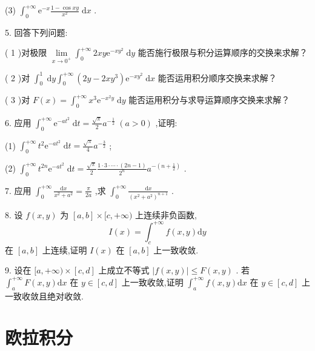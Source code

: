 (3) \({\int }_{0}^{+\infty }{\mathrm{e}}^{-x}\frac{1 - \cos {xy}}{{x}^{2}}\mathrm{\;d}x\) . 

5. 回答下列问题: 

( 1 )对极限 \(\mathop{\lim }\limits_{{x \rightarrow  {0}^{ + }}}{\int }_{0}^{+\infty }{2xy}{\mathrm{e}}^{-x{y}^{2}}\mathrm{\;d}y\) 能否施行极限与积分运算顺序的交换来求解？

 ( 2 )对 \({\int }_{0}^{1}\mathrm{\;d}y{\int }_{0}^{+\infty }\left( {{2y} - {2x}{y}^{3}}\right) {\mathrm{e}}^{-x{y}^{2}}\mathrm{\;d}x\) 能否运用积分顺序交换来求解？ 
 
 ( 3 )对 \(F\left( x\right)  = {\int }_{0}^{+\infty }{x}^{3}{\mathrm{e}}^{-{x}^{2}y}\mathrm{\;d}y\) 能否运用积分与求导运算顺序交换来求解？
 
  6. 应用 \({\int }_{0}^{+\infty }{\mathrm{e}}^{-a{t}^{2}}\mathrm{\;d}t = \frac{\sqrt{\pi }}{2}{a}^{-\frac{1}{2}}\;\left( {a > 0}\right)\) ,证明: 
  
  (1) \({\int }_{0}^{+\infty }{t}^{2}{\mathrm{e}}^{-a{t}^{2}}\mathrm{\;d}t = \frac{\sqrt{\pi }}{4}{a}^{-\frac{3}{2}}\) ;

(2) \({\int }_{0}^{+\infty }{t}^{2n}{\mathrm{e}}^{-a{t}^{2}}\mathrm{\;d}t = \frac{\sqrt{\pi }}{2}\frac{1 \cdot  3 \cdot  \cdots  \cdot  \left( {{2n} - 1}\right) }{{2}^{n}}{a}^{-\left( {n + \frac{1}{2}}\right) }\) .

7. 应用 \({\int }_{0}^{+\infty }\frac{\mathrm{d}x}{{x}^{2} + {a}^{2}} = \frac{\pi }{2a}\) ,求 \({\int }_{0}^{+\infty }\frac{\mathrm{d}x}{{\left( {x}^{2} + {a}^{2}\right) }^{n + 1}}\) .

8. 设 \(f\left( {x,y}\right)\) 为 \(\left\lbrack  {a,b}\right\rbrack   \times  \lbrack c, + \infty )\) 上连续非负函数,
\[
I\left( x\right)  = {\int }_{c}^{+\infty }f\left( {x,y}\right) \mathrm{d}y
\]
在 \(\left\lbrack  {a,b}\right\rbrack\) 上连续,证明 \(I\left( x\right)\) 在 \(\left\lbrack  {a,b}\right\rbrack\) 上一致收敛.

9. 设在 \(\lbrack a, + \infty ) \times  \left\lbrack  {c,d}\right\rbrack\) 上成立不等式 \(\left| {f\left( {x,y}\right) }\right|  \leq  F\left( {x,y}\right)\) . 若 \({\int }_{a}^{+\infty }F\left( {x,y}\right) \mathrm{d}x\) 在 \(y \in  \left\lbrack  {c,d}\right\rbrack\) 上一致收敛,证明 \({\int }_{a}^{+\infty }f\left( {x,y}\right) \mathrm{d}x\) 在 \(y \in  \left\lbrack  {c,d}\right\rbrack\) 上一致收敛且绝对收敛.

\section{欧拉积分}

